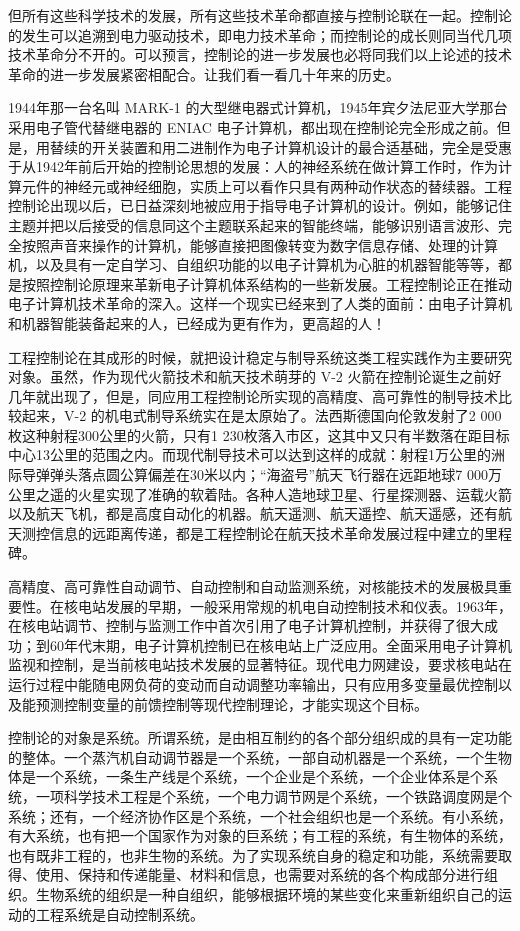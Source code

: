 但所有这些科学技术的发展，所有这些技术革命都直接与控制论联在一起。控制论的发生可以追溯到电力驱动技术，即电力技术革命；而控制论的成长则同当代几项技术革命分不开的。可以预言，控制论的进一步发展也必将同我们以上论述的技术革命的进一步发展紧密相配合。让我们看一看几十年来的历史。

1944年那一台名叫 MARK-1 的大型继电器式计算机，1945年宾夕法尼亚大学那台采用电子管代替继电器的 ENIAC 电子计算机，都出现在控制论完全形成之前。但是，用替续的开关装置和用二进制作为电子计算机设计的最合适基础，完全是受惠于从1942年前后开始的控制论思想的发展：人的神经系统在做计算工作时，作为计算元件的神经元或神经细胞，实质上可以看作只具有两种动作状态的替续器。工程控制论出现以后，已日益深刻地被应用于指导电子计算机的设计。例如，能够记住主题并把以后接受的信息同这个主题联系起来的智能终端，能够识别语言波形、完全按照声音来操作的计算机，能够直接把图像转变为数字信息存储、处理的计算机，以及具有一定自学习、自组织功能的以电子计算机为心脏的机器智能等等，都是按照控制论原理来革新电子计算机体系结构的一些新发展。工程控制论正在推动电子计算机技术革命的深入。这样一个现实已经来到了人类的面前：由电子计算机和机器智能装备起来的人，已经成为更有作为，更高超的人！

工程控制论在其成形的时候，就把设计稳定与制导系统这类工程实践作为主要研究对象。虽然，作为现代火箭技术和航天技术萌芽的 V-2 火箭在控制论诞生之前好几年就出现了，但是，同应用工程控制论所实现的高精度、高可靠性的制导技术比较起来，V-2 的机电式制导系统实在是太原始了。法西斯德国向伦敦发射了2 000枚这种射程300公里的火箭，只有1 230枚落入市区，这其中又只有半数落在距目标中心13公里的范围之内。而现代制导技术可以达到这样的成就：射程1万公里的洲际导弹弹头落点圆公算偏差在30米以内；“海盗号”航天飞行器在远距地球7 000万公里之遥的火星实现了准确的软着陆。各种人造地球卫星、行星探测器、运载火箭以及航天飞机，都是高度自动化的机器。航天遥测、航天遥控、航天遥感，还有航天测控信息的远距离传递，都是工程控制论在航天技术革命发展过程中建立的里程碑。

高精度、高可靠性自动调节、自动控制和自动监测系统，对核能技术的发展极具重要性。在核电站发展的早期，一般采用常规的机电自动控制技术和仪表。1963年，在核电站调节、控制与监测工作中首次引用了电子计算机控制，并获得了很大成功；到60年代末期，电子计算机控制已在核电站上广泛应用。全面采用电子计算机监视和控制，是当前核电站技术发展的显著特征。现代电力网建设，要求核电站在运行过程中能随电网负荷的变动而自动调整功率输出，只有应用多变量最优控制以及能预测控制变量的前馈控制等现代控制理论，才能实现这个目标。

控制论的对象是系统。所谓系统，是由相互制约的各个部分组织成的具有一定功能的整体。一个蒸汽机自动调节器是一个系统，一部自动机器是一个系统，一个生物体是一个系统，一条生产线是个系统，一个企业是个系统，一个企业体系是个系统，一项科学技术工程是个系统，一个电力调节网是个系统，一个铁路调度网是个系统；还有，一个经济协作区是个系统，一个社会组织也是一个系统。有小系统，有大系统，也有把一个国家作为对象的巨系统；有工程的系统，有生物体的系统，也有既非工程的，也非生物的系统。为了实现系统自身的稳定和功能，系统需要取得、使用、保持和传递能量、材料和信息，也需要对系统的各个构成部分进行组织。生物系统的组织是一种自组织，能够根据环境的某些变化来重新组织自己的运动的工程系统是自动控制系统。

